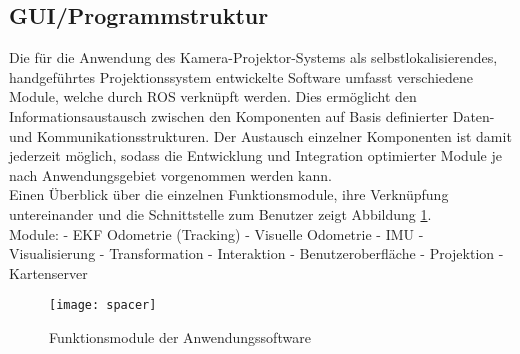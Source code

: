 \subsection{GUI/Programmstruktur}
Die für die Anwendung des Kamera-Projektor-Systems als selbstlokalisierendes, handgeführtes Projektionssystem entwickelte Software umfasst verschiedene Module, welche durch ROS verknüpft werden. Dies ermöglicht den Informationsaustausch zwischen den Komponenten auf Basis definierter Daten- und Kommunikationsstrukturen. Der Austausch einzelner Komponenten ist damit jederzeit möglich, sodass die Entwicklung und Integration optimierter Module je nach Anwendungsgebiet vorgenommen werden kann.\\
Einen Überblick über die einzelnen Funktionsmodule, ihre Verknüpfung untereinander und die Schnittstelle zum Benutzer zeigt Abbildung \ref{fig.modules}.\\

Module: \mLocalization - EKF Odometrie (Tracking) - Visuelle Odometrie - IMU - Visualisierung - Transformation - Interaktion - Benutzeroberfläche - Projektion - Kartenserver\\

\begin{figure}[ht]
	\begin{center}
		\texttt{[image: spacer]}
		\caption{Funktionsmodule der Anwendungssoftware}
		\label{fig.modules}
	\end{center}
\end{figure}

